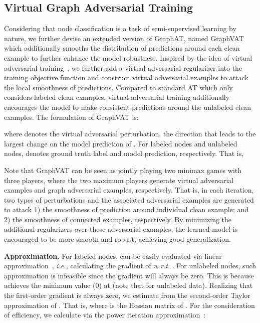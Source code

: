 \documentclass[10pt,journal,compsoc]{IEEEtran}
\newcommand{\ie}{\emph{i.e., }}
\newcommand{\wrt}{\emph{w.r.t. }}
\begin{document}
\subsection{Virtual Graph Adversarial Training}
Considering that node classification is a task of semi-supervised learning by nature, we further devise an extended version of GraphAT, named GraphVAT which additionally smooths the distribution of predictions around each clean example to further enhance the model robustness. Inspired by the idea of virtual adversarial training~\cite{miyato2018virtual}, we further add a virtual adversarial regularizer into the training objective function and construct virtual adversarial examples to attack the local smoothness of predictions. Compared to standard AT which only considers labeled clean examples, virtual adversarial training additionally encourages the model to make consistent predictions around the unlabeled clean examples. The formulation of GraphVAT is:

where  denotes the virtual adversarial perturbation, the direction that leads to the largest change on the model prediction of . For labeled nodes and unlabeled nodes,  denotes ground truth label and model prediction, respectively. That is,

Note that GraphVAT can be seen as jointly playing two minimax games with three players, where the two maximum players generate virtual adversarial examples and graph adversarial examples, respectively. That is, in each iteration, two types of perturbations and the associated adversarial examples are generated to attack 1) the smoothness of prediction around individual clean example; and 2) the smoothness of connected examples, respectively. By minimizing the additional regularizers over these adversarial examples, the learned model is encouraged to be more smooth and robust, achieving good generalization.

\textbf{Approximation.} For labeled nodes,  can be easily evaluated via linear approximation~\cite{goodfellow2015explaining}, \ie calculating the gradient of  \wrt . For unlabeled nodes, such approximation is infeasible since the gradient will always be zero. This is because  achieves the minimum value (0) at  (note that  for unlabeled data). Realizing that the first-order gradient is always zero, we estimate  from the second-order Taylor approximation of . That is,  where  is the Hessian matrix of . For the consideration of efficiency, we calculate  via the power iteration approximation~\cite{miyato2018virtual}:
\end{document}
